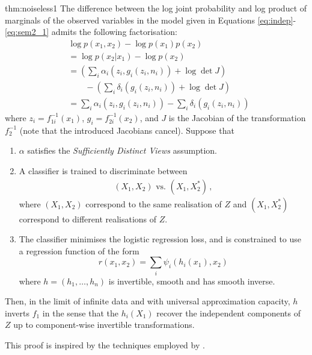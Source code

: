 \begin{reptheorem}{thm:noiseless1}
	The difference between the log joint probability and log product of marginals of the observed variables in the model given in Equations \ref{eq:indep}-\ref{eq:sem2_1} admits the following factorisation:
	\begin{align}
	&\log p({x}_1, {x}_2) - \log p({x}_1) p({x}_2) \nonumber \\
	&= \log p({x}_2 | {x}_1) - \log p({x}_2) \nonumber\\
	&= \left(\sum_i \alpha_i(z_{i}, g_i(z_i, n_i)) + \log \det J \right) \nonumber\\
	&\qquad - \left( \sum_i \delta_i(g_i(z_i, n_i)) + \log \det J\right) \nonumber\\
	&= \sum_i \alpha_i(z_{i}, g_i(z_i, n_i)) - \sum_i \delta_i(g_i(z_i, n_i))\label{eq:logdens_noiesless_1} \,
	\end{align}
	where $z_i=f^{-1}_{1i}({x}_1)$, $g_i=f^{-1}_{2i}({x}_2)$,
	and $J$ is the Jacobian of the transformation $f^{-1}_2$ (note that the introduced Jacobians cancel).
	Suppose that
	\begin{enumerate}
		\item $\alpha$ satisfies the \emph{Sufficiently Distinct Views} assumption.
		\item A classifier is trained to discriminate between
		\begin{align*}
		(X_{1},X_{2}) \text{ vs. } (X_{1},X_{2}^{*})\,,
		\end{align*}
		where $({X}_{1},{X}_{2})$ correspond to the same realisation of $Z$ and $({X}_{1},{X}_{2}^{*})$ correspond to different realisations of ${Z}$.
		\item The classifier minimises the logistic regression loss, and is constrained to use a regression function of the form
		\begin{equation*}
		r({x}_{1},{x}_{2})=\sum_{i}\psi_{i}(h_{i}({x}_{1}),{x}_{2})
		\end{equation*}
		where ${h} =(h_{1}, \ldots, h_{n})$  is invertible, smooth and has smooth inverse.
	\end{enumerate}
	
	Then, in the limit of infinite data and with universal approximation capacity, $h$ inverts ${f}_1$ in the sense that the $h_{i}(X_1)$ recover the independent components of $Z$ up to component-wise invertible transformations.
\end{reptheorem}

This proof is inspired by the techniques employed by \cite{hyvarinen19a}.

